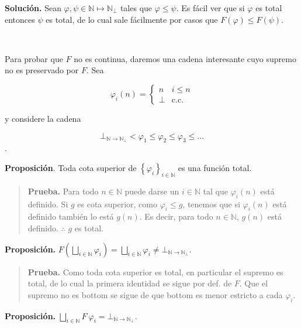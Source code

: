 \documentclass[a4paper, 12pt]{article}
\begin{document}
\textbf{Solución.} Sean $\varphi, \psi \in \mathbb{N} \mapsto \mathbb{N}_\bot $
tales que $\varphi \leq \psi$. Es fácil ver que si $\varphi$ es total entonces
$\psi$ es total, de lo cual sale fácilmente por casos que $F(\varphi) \leq
F(\psi)$.

~

Para probar que $F$ no es continua, daremos una cadena interesante cuyo supremo
no es preservado por $F$. Sea

\begin{equation*}
  \varphi_i(n) = \begin{cases}
    n & i \leq n \\ 
    \bot & \text{c.c.}
  \end{cases}
\end{equation*}

y considere la cadena 

$$\bot_{\mathbb{N}\to \mathbb{N}_\bot } < \varphi_1 \leq \varphi_2 \leq
\varphi_3 \leq \ldots$$. 

\textbf{Proposición}. Toda cota superior de $\left\{ \varphi_i \right\}_{i \in
\mathbb{N}}$ es una función total.


\small
\begin{quote}


\textbf{Prueba.} Para todo $n \in \mathbb{N}$ puede darse un $i
\in \mathbb{N}$ tal que $\varphi_i(n)$ está definido. Si $g$ es cota superior,
como $\varphi_i \leq g$, tenemos que si $\varphi_i(n)$ está definido también lo
está $g(n)$. Es decir, para todo $n \in \mathbb{N}$, $g(n)$ está definido.
$\therefore $ $g$ es total.

\end{quote}
\normalsize

\textbf{Proposición.} $F\left( \bigsqcup_{i \in \mathbb{N}} \varphi_i \right) =
\bigsqcup_{i \in \mathbb{N}} \varphi_i \neq \bot_{\mathbb{N}\to \mathbb{N}_\bot }$.


\small
\begin{quote}

\textbf{Prueba.} Como toda cota superior es total, en particular el supremo es
total, de lo cual la primera identidad se sigue por def. de $F$. Que el supremo
no es bottom se sigue de que bottom es menor estricto a cada $\varphi_i$.

\end{quote}
\normalsize

\textbf{Proposición.} $\bigsqcup_{i \in \mathbb{N}} F ~ \varphi_i =
\bot_{\mathbb{N} \to \mathbb{N}_\bot }$.
\end{document}
